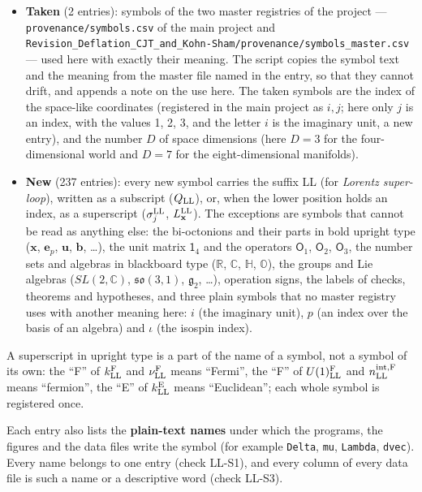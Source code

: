 \documentclass[
  10pt,
]{article}
\providecommand{\tightlist}{%
  \setlength{\itemsep}{0pt}\setlength{\parskip}{0pt}}
\begin{document}
\begin{itemize}
\tightlist
\item
  \textbf{Taken} (2 entries): symbols of the two master registries of
  the project --- \texttt{provenance/symbols.csv} of the main project
  and
  \texttt{Revision\_Deflation\_CJT\_and\_Kohn-Sham/provenance/symbols\_master.csv}
  --- used here with exactly their meaning. The script copies the symbol
  text and the meaning from the master file named in the entry, so that
  they cannot drift, and appends a note on the use here. The taken
  symbols are the index of the space-like coordinates (registered in the
  main project as \(i,j\); here only \(j\) is an index, with the values
  1, 2, 3, and the letter \(i\) is the imaginary unit, a new entry), and
  the number \(D\) of space dimensions (here \(D=3\) for the
  four-dimensional world and \(D=7\) for the eight-dimensional
  manifolds).
\item
  \textbf{New} (237 entries): every new symbol carries the suffix LL
  (for \emph{Lorentz super-loop}), written as a subscript
  (\(Q_{\rm LL}\)), or, when the lower position holds an index, as a
  superscript (\(\sigma^{\rm LL}_j\), \(L^{\rm LL}_{\mathbf x}\)). The
  exceptions are symbols that cannot be read as anything else: the
  bi-octonions and their parts in bold upright type (\(\mathbf x\),
  \(\mathbf e_p\), \(\mathbf u\), \(\mathbf b\), \ldots), the unit
  matrix \(\mathsf 1_4\) and the operators \(\mathsf O_1\),
  \(\mathsf O_2\), \(\mathsf O_3\), the number sets and algebras in
  blackboard type (\(\mathbb R\), \(\mathbb C\), \(\mathbb H\),
  \(\mathbb O\)), the groups and Lie algebras (\(SL(2,\mathbb C)\),
  \(\mathfrak{so}(3,1)\), \(\mathfrak g_2\), \ldots), operation signs,
  the labels of checks, theorems and hypotheses, and three plain symbols
  that no master registry uses with another meaning here: \(i\) (the
  imaginary unit), \(p\) (an index over the basis of an algebra) and
  \(\iota\) (the isospin index).
\end{itemize}

A superscript in upright type is a part of the name of a symbol, not a
symbol of its own: the ``F'' of \(k^{\rm F}_{\rm LL}\) and
\(\nu^{\rm F}_{\rm LL}\) means ``Fermi'', the ``F'' of
\(U(1)^{\rm F}_{\rm LL}\) and \(n^{\rm int,F}_{\rm LL}\) means
``fermion'', the ``E'' of \(k^{\rm E}_{\rm LL}\) means ``Euclidean'';
each whole symbol is registered once.

Each entry also lists the \textbf{plain-text names} under which the
programs, the figures and the data files write the symbol (for example
\texttt{Delta}, \texttt{mu}, \texttt{Lambda}, \texttt{dvec}). Every name
belongs to one entry (check LL-S1), and every column of every data file
is such a name or a descriptive word (check LL-S3).
\end{document}
